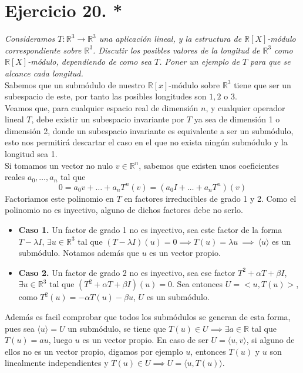 \section{Ejercicio 20. *} \textit{Consideramos \(T:\mathbb{R}^3 \to
  \mathbb{R}^3\) una aplicación lineal, y la estructura de
  \(\mathbb{R}[X]\)-módulo correspondiente sobre \(\mathbb{R}^3\). Discutir los
  posibles valores de la longitud de \(\mathbb{R}^3\) como
  \(\mathbb{R}[X]\)-módulo, dependiendo de como sea \(T\). Poner un ejemplo de
  \(T\) para que se alcance cada longitud.}\\

Sabemos que un submódulo de nuestro \(\mathbb{R}[x]\)-módulo sobre
\(\mathbb{R}^3\) tiene  que ser un subespacio de este, por tanto las posibles
longitudes son \(1,2\) o \(3\).\\

Veamos que, para cualquier espacio real de dimensión \(n\), y cualquier operador
lineal \(T\), debe existir un subespacio invariante por \(T\) ya sea de
dimensión 1 o dimensión 2, donde un subespacio invariante es equivalente a ser
un submódulo, esto nos permitirá descartar el caso en el que no exista ningún
submódulo y la longitud sea 1.\\

Si tomamos un vector no nulo \(v \in \mathbb{R}^n\), sabemos que existen unos
coeficientes reales \(a_0, \dots, a_n\) tal que
\[
  0 = a_0v + \dots + a_nT^n(v) = (a_0I + \dots + a_nT^n)(v)
\]
Factoriamos este polinomio en \(T\) en factores irreducibles de grado 1 y 2.
Como el polinomio no es inyectivo, alguno de dichos factores debe no serlo.
\begin{itemize}
\item \textbf{Caso 1.} Un factor de grado 1 no es inyectivo, sea este factor de la
  forma \(T - \lambda I\), \(\exists u \in \mathbb{R}^3\) tal que \((T - \lambda
  I)(u) = 0 \implies T(u) = \lambda u \ \implies \ \langle u \rangle\) es un submódulo. Notamos además que \(u\) es un vector propio.
\item \textbf{Caso 2.} Un factor de grado 2 no es inyectivo, sea ese factor
  \(T^2 + \alpha T + \beta I\), \(\exists u \in \mathbb{R}^3\) tal que \((T^2 +
  \alpha T + \beta I)(u)= 0\). Sea entonces \(U = <u,T(u)>\), como \(T^2(u) =
  -\alpha T(u) - \beta u \), \(U\) es un submódulo.
\end{itemize}

Además es facil comprobar que todos los submódulos se generan de
esta forma, pues sea \(\langle u \rangle = U\) un submódulo, se tiene que \(T(u)
\in U \implies \exists a \in \mathbb{R}\) tal que \(T(u) = au\), luego \(u\) es un
vector propio. En caso de ser \(U = \langle u , v \rangle\), si alguno de ellos
no es un vector propio, digamos por ejemplo \(u\), entonces \(T(u)\) y \(u\) son linealmente independientes y
\(T(u) \in U \implies U = \langle u , T(u) \rangle\).\\

